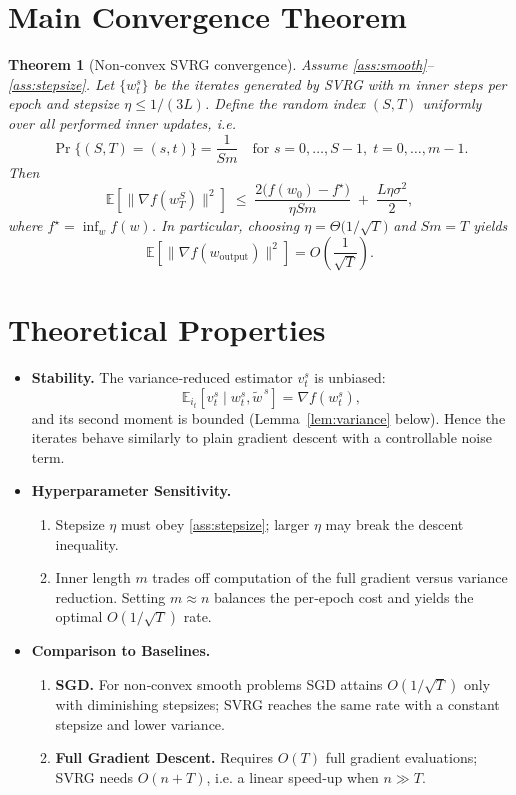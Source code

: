 \documentclass{article}
\newtheorem{theorem}{Theorem}
\begin{document}
\section*{Main Convergence Theorem}
\begin{theorem}[Non‑convex SVRG convergence]\label{thm:svrg}
Assume \ref{ass:smooth}–\ref{ass:stepsize}. Let $\{w_{t}^{s}\}$ be the iterates generated by SVRG with $m$ inner steps per epoch and stepsize $\eta\le1/(3L)$. Define the random index $(S,T)$ uniformly over all performed inner updates, i.e.
\[
\Pr\{(S,T)=(s,t)\}= \frac{1}{Sm}\quad\text{for }s=0,\dots,S-1,\;t=0,\dots,m-1 .
\]
Then
\[
\mathbb{E}\!\left[\|\nabla f(w_{T}^{S})\|^{2}\right]
\;\le\;
\frac{2\bigl(f(w_{0})-f^{\star}\bigr)}{\eta Sm}
\;+\;
\frac{L\eta\sigma^{2}}{2},
\tag{1}
\]
where $f^{\star}=\inf_{w}f(w)$. In particular, choosing $\eta=\Theta\!\bigl(1/\sqrt{T}\bigr)$ and $Sm=T$ yields
\[
\mathbb{E}\!\left[\|\nabla f(w_{\text{output}})\|^{2}\right]=O\!\left(\frac{1}{\sqrt{T}}\right).
\]
\end{theorem}

\section*{Theoretical Properties}
\begin{itemize}
\item \textbf{Stability.} The variance‑reduced estimator $v_t^{s}$ is unbiased:
\[
\mathbb{E}_{i_t}[v_t^{s}\mid w_{t}^{s},\tilde w^{\,s}]
     =\nabla f(w_{t}^{s}),
\]
and its second moment is bounded (Lemma~\ref{lem:variance} below). Hence the iterates behave similarly to plain gradient descent with a controllable noise term.

\item \textbf{Hyperparameter Sensitivity.}
\begin{enumerate}[label=\alph*)]
\item Stepsize $\eta$ must obey \ref{ass:stepsize}; larger $\eta$ may break the descent inequality.
\item Inner length $m$ trades off computation of the full gradient versus variance reduction. Setting $m\approx n$ balances the per‑epoch cost and yields the optimal $O(1/\sqrt{T})$ rate.
\end{enumerate}

\item \textbf{Comparison to Baselines.}
\begin{enumerate}[label=\alph*)]
\item \textbf{SGD.} For non‑convex smooth problems SGD attains $O(1/\sqrt{T})$ only with diminishing stepsizes; SVRG reaches the same rate with a constant stepsize and lower variance.
\item \textbf{Full Gradient Descent.} Requires $O(T)$ full gradient evaluations; SVRG needs $O(n+T)$, i.e. a linear speed‑up when $n\gg T$.
\end{enumerate}
\end{itemize}
\end{document}
